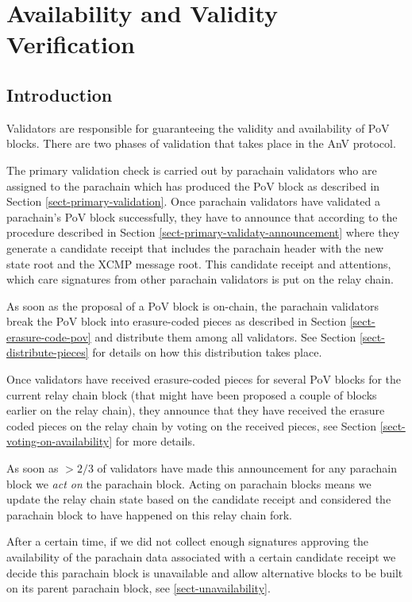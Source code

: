 \chapter{Availability and Validity Verification}

\section{Introduction}

Validators are responsible for guaranteeing the validity and availability of PoV blocks. 
There are two phases of validation that takes place in the AnV protocol. 

The primary validation check is carried out by parachain validators who are assigned to the parachain which has produced the PoV block as described in Section \ref{sect-primary-validation}. Once parachain validators have validated a parachain's PoV block successfully, they have to announce that according to the procedure described in Section \ref{sect-primary-validaty-announcement} where they generate a candidate receipt that includes the parachain header with the new state root and the XCMP message root. This candidate receipt and attentions, which care signatures from other parachain validators is put on the relay chain. 

As soon as the proposal of a PoV block is on-chain, the parachain validators break the PoV block into erasure-coded pieces as described in Section \ref{sect-erasure-code-pov} and distribute them among all validators. See Section \ref{sect-distribute-pieces} for details on how this distribution takes place.
	 
Once validators have received erasure-coded pieces for several PoV blocks for the current relay chain block (that might have been proposed a couple of blocks earlier on the relay chain), they announce that they have received the erasure coded pieces on the relay chain by voting on the received pieces, see Section \ref{sect-voting-on-availability} for more details. 

As soon as $>2/3$ of validators have made this announcement for any parachain block we \emph{act on} the parachain block. Acting on parachain blocks means we update the relay chain state based on the candidate receipt and considered the parachain block to have happened on this relay chain fork. 

After a certain time, if we did not collect enough signatures approving the availability of the parachain data associated with a certain candidate receipt we decide this parachain block is unavailable and allow alternative blocks to be built on its parent parachain block, see \ref{sect-unavailability}. 

